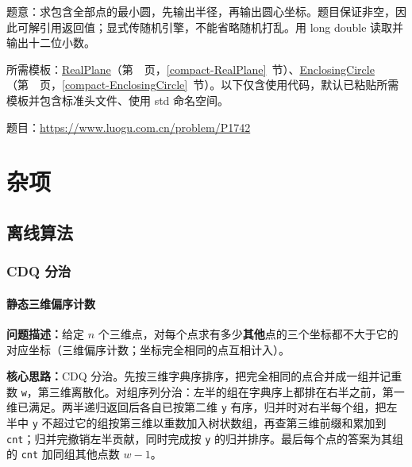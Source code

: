 \label{usage-example-61}

题意：求包含全部点的最小圆，先输出半径，再输出圆心坐标。题目保证非空，因此可解引用返回值；显式传随机引擎，不能省略随机打乱。用 long double 读取并输出十二位小数。

所需模板：\hyperref[compact-RealPlane]{RealPlane}（第~\pageref{compact-RealPlane}~页，\ref{compact-RealPlane}~节）、\hyperref[compact-EnclosingCircle]{EnclosingCircle}（第~\pageref{compact-EnclosingCircle}~页，\ref{compact-EnclosingCircle}~节）。以下仅含使用代码，默认已粘贴所需模板并包含标准头文件、使用 std 命名空间。

题目：\url{https://www.luogu.com.cn/problem/P1742}





\part{杂项}

\newpage

\Needspace{680pt}

\chapter{离线算法}

\section{CDQ 分治}

\subsection{静态三维偏序计数}\label{compact-Dominance3D}

\noindent\textbf{问题描述：}\allowbreak 给定 $n$ 个三维点，对每个点求有多少\textbf{其他}点的三个坐标都不大于它的对应坐标（三维偏序计数；坐标完全相同的点互相计入）。

\textbf{核心思路：}\allowbreak CDQ 分治。先按三维字典序排序，把完全相同的点合并成一组并记重数 \texttt{w}，第三维离散化。对组序列分治：左半的组在字典序上都排在右半之前，第一维已满足。两半递归返回后各自已按第二维 \texttt{y} 有序，归并时对右半每个组，把左半中 \texttt{y} 不超过它的组按第三维以重数加入树状数组，再查第三维前缀和累加到 \texttt{cnt}；归并完撤销左半贡献，同时完成按 \texttt{y} 的归并排序。最后每个点的答案为其组的 \texttt{cnt} 加同组其他点数 $w-1$。

